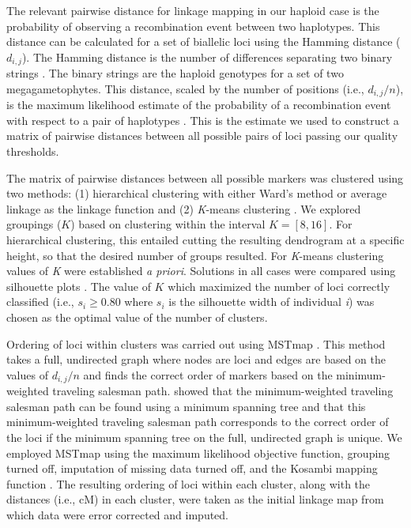 \documentclass[11pt]{article}
\begin{document}
The relevant pairwise distance for linkage mapping in our haploid case is the probability of observing a recombination 
event between two haplotypes. This distance can be calculated for a set of biallelic loci using the Hamming distance ($d_{i,j}$).
The Hamming distance is the number of differences separating two binary strings \citep{Hamming:1950}. The binary strings are the haploid
genotypes for a set of two megagametophytes. This distance, scaled by the number of positions (i.e., $d_{i,j}/n$), 
is the maximum likelihood estimate of the probability of a recombination event with respect to a pair of haplotypes \citep{Wu:2008a}.
This is the estimate we used to construct a matrix of pairwise distances between all possible pairs of loci passing our quality thresholds.

The matrix of pairwise distances between all possible markers was clustered using two methods: (1) hierarchical clustering with 
either Ward's method \citep{Ward:1963} or average linkage \citep{Sokal:1958} as the linkage function and (2) \textit{K}-means clustering \citep{Hartigan:1979}. We explored groupings ($K$) based on clustering within the interval $K=[8,16]$. For hierarchical clustering, this 
entailed cutting the resulting dendrogram at a specific height, so that the desired number of groups resulted. For \textit{K}-means clustering
values of \textit{K} were established \textit{a priori}. Solutions in all cases were compared using silhouette plots \citep{Rousseeuw:1987}.
The value of $K$ which maximized the number of loci correctly classified  (i.e., $s_{i} \geq 0.80$ where $s_{i}$ is the 
silhouette width of individual \textit{i}) was chosen as the optimal value of the number of clusters.

Ordering of loci within clusters was carried out using MSTmap \citep{Wu:2008a}. This method takes a full, undirected graph where nodes are loci and edges are based on the values of $d_{i,j}/n$ and finds the correct order of markers based on the minimum-weighted traveling salesman path. \citet{Wu:2008a} showed that the minimum-weighted traveling salesman path
can be found using a minimum spanning tree and that this minimum-weighted traveling
salesman path corresponds to the correct order of the loci if the minimum spanning tree on
the full, undirected graph is unique. We employed MSTmap using the maximum likelihood objective function, grouping turned off, imputation of 
missing data turned off, and the Kosambi mapping function \citep{Kosambi:1944}. The resulting ordering of loci
within each cluster, along with the distances (i.e., cM) in each cluster, were taken as the initial linkage map from which
data were error corrected and imputed.
 
\end{document}
